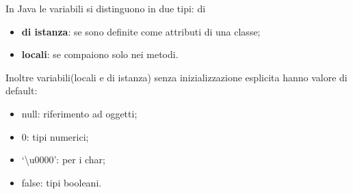 \documentclass{subfile}
\begin{document}
In Java le variabili si distinguono in due tipi: di
\begin{itemize}
    \item \textbf{di istanza}: se sono definite come attributi di una classe;
    \item \textbf{locali}: se compaiono solo nei metodi.
\end{itemize}

Inoltre variabili(locali e di istanza) senza inizializzazione esplicita hanno valore di default:
\begin{itemize}
    \item null: riferimento ad oggetti;
    \item 0: tipi numerici;
    \item `\textbackslash u0000': per i char;
    \item false: tipi booleani.
\end{itemize}
\end{document}
